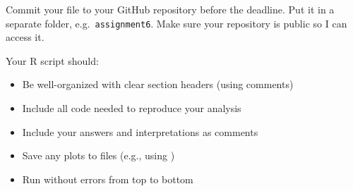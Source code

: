 Commit your file to your GitHub repository before the deadline. Put it in a separate folder, e.g.\ \texttt{assignment6}. Make sure your repository is public so I can access it.

Your R script should:
\begin{itemize}
  \item Be well-organized with clear section headers (using comments)
  \item Include all code needed to reproduce your analysis
  \item Include your answers and interpretations as comments
  \item Save any plots to files (e.g., using )
  \item Run without errors from top to bottom
\end{itemize}


